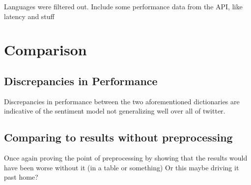 Languages were filtered out.
Include some performance data from the API, like latency and stuff

\section{Comparison}
\label{sec:comparison}

\subsection{Discrepancies in Performance}
\label{subsec:discrepanciesinperformance}

Discrepancies in performance between the two aforementioned dictionaries are indicative of the sentiment model not generalizing well over all of twitter.

\subsection{Comparing to results without preprocessing}
\label{subsec:comparingToResultsWithoutPreprocessing}
Once again proving the point of preprocessing by showing that the results would have been worse without it (in a table or something)
Or this maybe driving it past home?


